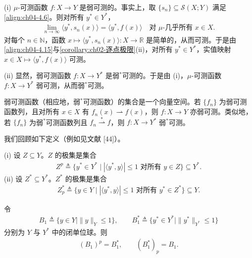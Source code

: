 \documentclass[../../main.tex]{subfiles}%
\begin{document}
\begin{remark}\label{remark:ch04-弱可测注}
(i) $\mu$-可测函数 $f:X\to Y$ 是弱可测的。事实上，取 $\{s_n\}\subseteq\mathcal{S}(X;Y)$ 满足\eqref{align:ch04-4.6}。则对所有 $y^*\in Y^*$，
\begin{align}
\lim_{n\to\infty}\langle y^*,s_n(x)\rangle=\langle y^*,f(x)\rangle\quad\text{对 }\mu\text{-几乎所有 }x\in X. \label{align:ch04-4.15}
\end{align}
对每个 $n\in\mathbb{N}$，函数 $x\mapsto\langle y^*,s_n(x)\rangle:X\to\mathbb{R}$ 是简单的，从而可测。于是由\eqref{align:ch04-4.15}与\cref{corollary:ch02-逐点极限}(ii)，对所有 $y^*\in Y^*$，实值映射 $x\in X\mapsto\langle y^*,f(x)\rangle$ 可测。

(ii) 显然，弱可测函数 $f:X\to Y^*$ 是弱$^*$可测的。于是由 (i)，$\mu$-可测函数 $f:X\to Y^*$ 弱可测，从而弱$^*$可测。
\end{remark}

\begin{remark}\label{remark:ch04-弱可测空间}
弱可测函数（相应地，弱$^*$可测函数）的集合是一个向量空间。若 $\{f_n\}$ 为弱可测函数列，且对所有 $x\in X$ 有 $f_n(x)\rightharpoonup f(x)$，则 $f:X\to Y$ 亦弱可测。类似地，若 $\{f_n\}$ 为弱$^*$可测函数列且 $f_n\overset{*}{\rightharpoonup}f$，则 $f:X\to Y^*$ 弱$^*$可测。
\end{remark}

我们回顾如下定义（例如见文献 [44]）。

\begin{definition}[极集]\label{definition:ch04-极集}
(i) 设 $Z\subseteq Y$。$Z$ 的极集是集合
\begin{align*}
Z^p\triangleq \{y^*\in Y^*\mid |\langle y^*,y\rangle|\leqslant1\text{ 对所有 }y\in Z\}\subseteq Y^*.
\end{align*}
(ii) 设 $Z^*\subseteq Y^*$。$Z^*$ 的极集是集合
\begin{align*}
Z_p^*\triangleq \{y\in Y\mid |\langle y^*,y\rangle|\leqslant1\text{ 对所有 }y^*\in Z^*\}\subseteq Y.
\end{align*}
\end{definition}

\begin{remark}\label{remark:ch04-单位球极集}
令
\begin{align*}
B_1\triangleq \{y\in Y\mid\|y\|_Y\leqslant1\},\qquad B_1^*\triangleq \{y^*\in Y^*\mid\|y^*\|_{Y^*}\leqslant1\}
\end{align*}
分别为 $Y$ 与 $Y^*$ 中的闭单位球。则
\begin{align}
(B_1)^p=B_1^*,\qquad (B_1^*)_p=B_1. \label{align:ch04-4.16}
\end{align}
\end{remark}
\end{document}
